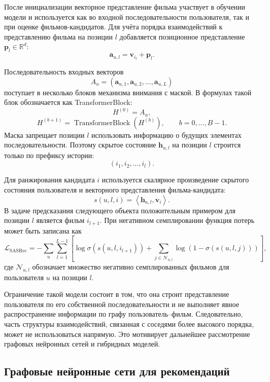 \documentclass[12pt,fleqn]{article}
\begin{document}
После инициализации векторное представление фильма участвует в обучении модели и используется
как во входной последовательности пользователя, так и при оценке
фильмов-кандидатов. Для учёта порядка взаимодействий к представлению фильма на
позиции $l$ добавляется позиционное представление
$\mathbf{p}_l\in\mathbb{R}^{d}$:
$$
    \mathbf{a}_{u,l}
    =
    \mathbf{v}_{i_l}
    +
    \mathbf{p}_l.
$$

Последовательность входных векторов
$$
    A_u=
    \left(
        \mathbf{a}_{u,1},
        \mathbf{a}_{u,2},
        \ldots,
        \mathbf{a}_{u,L}
    \right)
$$
поступает в несколько блоков механизма внимания с маской. В формулах такой блок обозначается как TransformerBlock:
$$
    H^{(0)}=A_u,
$$
$$
    H^{(b+1)}
    =
    \operatorname{TransformerBlock}
    \left(
        H^{(b)}
    \right),
    \qquad
    b=0,\ldots,B-1.
$$
Маска запрещает позиции $l$ использовать информацию о будущих
элементах последовательности. Поэтому скрытое состояние $\mathbf{h}_{u,l}$ на
позиции $l$ строится только по префиксу истории:
$$
    (i_1,i_2,\ldots,i_l).
$$

Для ранжирования кандидата $i$ используется скалярное произведение скрытого
состояния пользователя и векторного представления фильма-кандидата:
$$
    s(u,l,i)
    =
    \left\langle
        \mathbf{h}_{u,l},
        \mathbf{v}_{i}
    \right\rangle.
$$
В задаче предсказания следующего объекта положительным примером для позиции
$l$ является фильм $i_{l+1}$. При негативном семплировании функция потерь может
быть записана как
$$
    \mathcal{L}_{\mathrm{SASRec}}
    =
    -
    \sum_{u}
    \sum_{l=1}^{L-1}
    \left[
        \log\sigma
        \left(
            s(u,l,i_{l+1})
        \right)
        +
        \sum_{j\in\mathcal{N}_{u,l}}
        \log
        \left(
            1-
            \sigma
            \left(
                s(u,l,j)
            \right)
        \right)
    \right],
$$
где $\mathcal{N}_{u,l}$ обозначает множество негативно семплированных фильмов для
пользователя $u$ на позиции $l$.



Ограничение такой модели состоит в том, что она строит представление пользователя
по его собственной последовательности и не выполняет явное распространение
информации по графу пользователь--фильм. Следовательно, часть структуры
взаимодействий, связанная с соседями более высокого порядка, может не
использоваться напрямую. Это мотивирует дальнейшее рассмотрение графовых
нейронных сетей и гибридных моделей.
\subsection{Графовые нейронные сети для рекомендаций}
\end{document}
